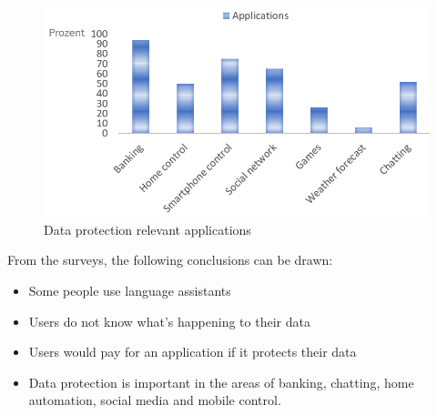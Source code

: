 \begin{figure}[h]
	\centering
	\includegraphics[width=0.9\linewidth]{Picture/umfrage_anwendung}
	\caption[Data protection relevant applications]{Data protection relevant applications}
	\label{survey_application}
\end{figure}

From the surveys, the following conclusions can be drawn:
\begin{itemize}	
	\item Some people use language assistants
	\item Users do not know what's happening to their data
	\item Users would pay for an application if it protects their data
	\item Data protection is important in the areas of banking, chatting, home automation, social media and mobile control.
\end{itemize}
